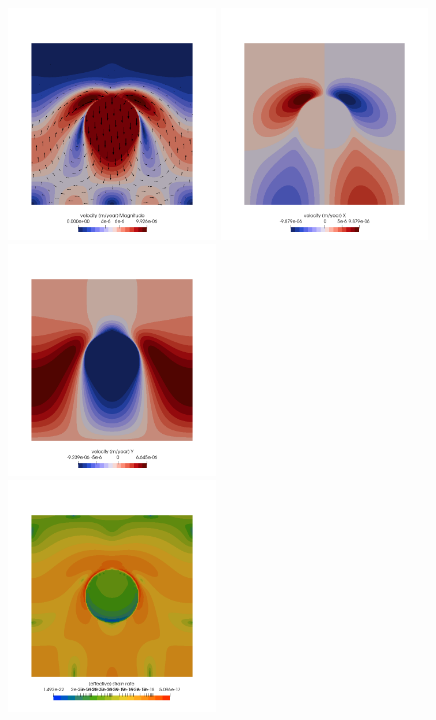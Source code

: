 \begin{center}
\includegraphics[width=5.5cm]{python_codes/fieldstone_87/results/experiment_06/vel.png}
\includegraphics[width=5.5cm]{python_codes/fieldstone_87/results/experiment_06/u.png}
\includegraphics[width=5.5cm]{python_codes/fieldstone_87/results/experiment_06/v.png}\\
\includegraphics[width=5.5cm]{python_codes/fieldstone_87/results/experiment_06/sr.png}

\end{center}
